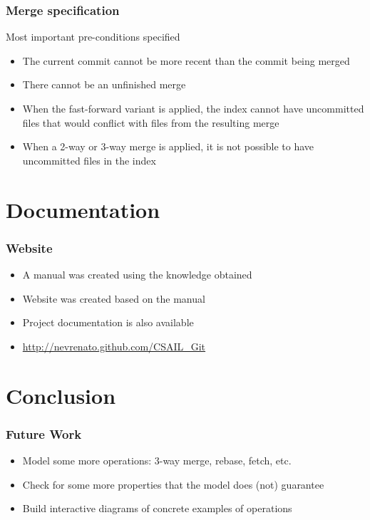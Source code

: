 \documentclass{beamer}
\begin{document}
\begin{frame}[fragile]
	\frametitle{Merge specification}
	\begin{block}{Most important pre-conditions specified}
	\begin{itemize}
		\item The current commit cannot be more recent than the commit
		being merged
		\item There cannot be an unfinished merge
		\item When the fast-forward variant is applied, the index cannot have
		uncommitted files that would conflict with files from the 
		resulting merge
		\item When a 2-way or 3-way merge is applied, it is not possible
		to have uncommitted files in the index
	\end{itemize}
	\end{block}


\end{frame}

\section{Documentation}

\begin{frame}
	\frametitle{Website}
	\begin{itemize}
	\item A manual was created using the knowledge obtained
	\item Website was created based on the manual 
	\item Project documentation is also available
	\item \url{http://nevrenato.github.com/CSAIL\_Git}
	\end{itemize}

\end{frame}

\section{Conclusion}

\begin{frame}
	\frametitle{Future Work}
	\begin{itemize}
	\item Model some more operations: 3-way merge, rebase, fetch, etc. 
	\item Check for some more properties that the model does (not) guarantee
	\item Build interactive diagrams of concrete examples of operations 
	\end{itemize}
\end{frame}
\end{document}
